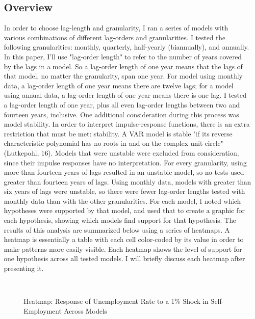 \documentclass[]{ecca}
\begin{document}
\subsection{Overview}
In order to choose lag-length and granularity, I ran a series of models with various combinations of different lag-orders and granularities. I tested the following granularities: monthly, quarterly, half-yearly (biannually), and annually. In this paper, I'll use "lag-order length" to refer to the number of years covered by the lags in a model. So a lag-order length of one year means that the lags of that model, no matter the granularity, span one year. For model using monthly data, a lag-order length of one year means there are twelve lags; for a model using annual data, a lag-order length of one year means there is one lag. I tested a lag-order length of one year, plus all even lag-order lengths between two and fourteen years, inclusive. One additional consideration during this process was model stability. In order to interpret impulse-response functions, there is an extra restriction that must be met: stability. A VAR model is stable "if its reverse characteristic polynomial has no roots in and on the complex unit circle" (Lutkepohl, 16). Models that were unstable were excluded from consideration, since their impulse responses have no interpretation. For every granularity, using more than fourteen years of lags resulted in an unstable model, so no tests used greater than fourteen years of lags. Using monthly data, models with greater than six years of lags were unstable, so there were fewer lag-order lengths tested with monthly data than with the other granularities. For each model, I noted which hypotheses were supported by that model, and used that to create a graphic for each hypothesis, showing which models find support for that hypothesis. The results of this analysis are summarized below using a series of heatmaps. A heatmap is essentially a table with each cell color-coded by its value in order to make patterns more easily visible. Each heatmap shows the level of support for one hypothesis across all tested models. I will briefly discuss each heatmap after presenting it.

\begin{figure}[!h]
	\centering
	\medskip\\
	\caption{Heatmap: Response of Unemployment Rate to a 1\% Shock in Self-Employment Across Models}
	\label{fig:hm-IRF_US}
\end{figure}
\end{document}
